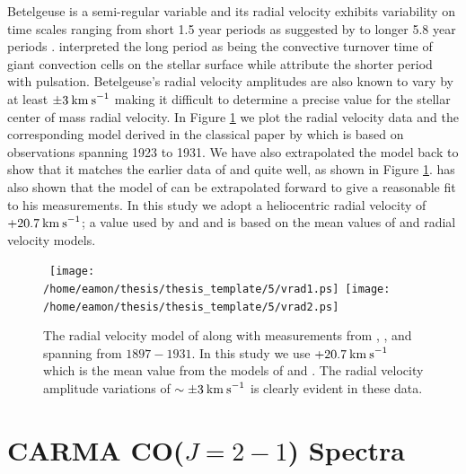 Betelgeuse is a  semi-regular variable and its radial velocity exhibits variability on time scales ranging from short 1.5 year periods as suggested by \cite{stebbins_1931} to longer 5.8 year periods \citep{spencer_jones_1928,smith_1989}. 
\cite{stothers_1971} interpreted the long period as being the convective turnover time of giant convection cells on the stellar surface while \cite{dupree_1990} attribute the shorter period with pulsation. Betelgeuse's radial velocity amplitudes are also known to vary by at least $\pm 3\>{\rm km\>s}^{-1}$ \citep{smith_1989} making it difficult to determine a precise value for the stellar center of mass radial velocity. In Figure \ref{fig:5.3} we plot the radial velocity data and the corresponding model derived in the classical paper by \cite{sanford_1933} which is based on observations spanning 1923 to 1931. We have also extrapolated the model back to show that it matches the earlier data of \cite{bottlinger_1911} and \cite{spencer_jones_1928} quite well, as shown in Figure \ref{fig:5.3}. \cite{goldberg_1984} has also shown that the model of \cite{sanford_1933} can be extrapolated forward to give a reasonable fit to his measurements. In this study we adopt a heliocentric radial velocity of $+20.7\>{\rm km\>s}^{-1}$;  a value used by \cite{weymann_1962} and \citet{harper_2008} and is based on the mean values of \cite{spencer_jones_1928} and \cite{sanford_1933} radial velocity models. 

\begin{figure}[!ht]
\centering 
\mbox{
          \texttt{[image: /home/eamon/thesis/thesis\_template/5/vrad1.ps]}
          \texttt{[image: /home/eamon/thesis/thesis\_template/5/vrad2.ps]}
          }
\caption[Radial velocity data and model for $\alpha$ Ori.]{The radial velocity model of \cite{sanford_1933} along with measurements from \cite{bottlinger_1911}, \cite{spencer_jones_1928}, and \cite{sanford_1933} spanning from $1897 - 1931$. In this study we use $+20.7\>{\rm km\>s}^{-1}$ which is the mean value from the models of \cite{spencer_jones_1928} and \cite{sanford_1933}. The radial velocity amplitude variations of $\sim \pm 3\>{\rm km\>s}^{-1}$ is clearly evident in these data.}
\label{fig:5.3}
\end{figure}

\section{CARMA CO($J=2-1$) Spectra}
\label{sec:5.3}

